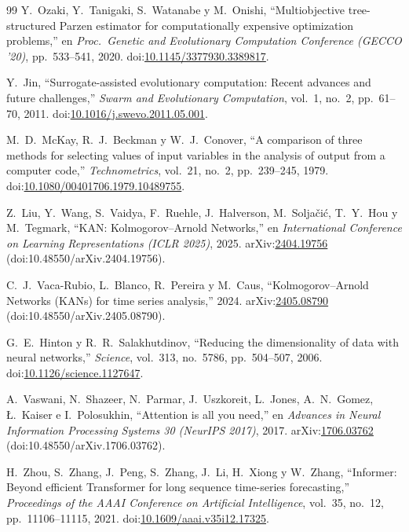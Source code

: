 \begin{thebibliography}{99}
 Y.~Ozaki, Y.~Tanigaki, S.~Watanabe y M.~Onishi, ``Multiobjective
tree-structured Parzen estimator for computationally expensive optimization
problems,'' en \emph{Proc.\ Genetic and Evolutionary Computation Conference (GECCO
'20)}, pp.~533--541, 2020.
doi:\href{https://doi.org/10.1145/3377930.3389817}{10.1145/3377930.3389817}.

 Y.~Jin, ``Surrogate-assisted evolutionary computation: Recent
advances and future challenges,'' \emph{Swarm and Evolutionary Computation}, vol.~1,
no.~2, pp.~61--70, 2011.
doi:\href{https://doi.org/10.1016/j.swevo.2011.05.001}{10.1016/j.swevo.2011.05.001}.

 M.~D.~McKay, R.~J.~Beckman y W.~J.~Conover, ``A comparison of
three methods for selecting values of input variables in the analysis of output from a
computer code,'' \emph{Technometrics}, vol.~21, no.~2, pp.~239--245, 1979.
doi:\href{https://doi.org/10.1080/00401706.1979.10489755}{10.1080/00401706.1979.10489755}.

 Z.~Liu, Y.~Wang, S.~Vaidya, F.~Ruehle, J.~Halverson,
M.~Solja\v{c}i\'c, T.~Y.~Hou y M.~Tegmark, ``KAN: Kolmogorov--Arnold Networks,'' en
\emph{International Conference on Learning Representations (ICLR 2025)}, 2025.
arXiv:\href{https://doi.org/10.48550/arXiv.2404.19756}{2404.19756}
(doi:10.48550/arXiv.2404.19756).

 C.~J.~Vaca-Rubio, L.~Blanco, R.~Pereira y M.~Caus,
``Kolmogorov--Arnold Networks (KANs) for time series analysis,'' 2024.
arXiv:\href{https://doi.org/10.48550/arXiv.2405.08790}{2405.08790}
(doi:10.48550/arXiv.2405.08790).

 G.~E.~Hinton y R.~R.~Salakhutdinov, ``Reducing the
dimensionality of data with neural networks,'' \emph{Science}, vol.~313, no.~5786,
pp.~504--507, 2006.
doi:\href{https://doi.org/10.1126/science.1127647}{10.1126/science.1127647}.

 A.~Vaswani, N.~Shazeer, N.~Parmar, J.~Uszkoreit, L.~Jones,
A.~N.~Gomez, {\L}.~Kaiser e I.~Polosukhin, ``Attention is all you need,'' en
\emph{Advances in Neural Information Processing Systems 30 (NeurIPS 2017)}, 2017.
arXiv:\href{https://doi.org/10.48550/arXiv.1706.03762}{1706.03762}
(doi:10.48550/arXiv.1706.03762).

 H.~Zhou, S.~Zhang, J.~Peng, S.~Zhang, J.~Li, H.~Xiong y
W.~Zhang, ``Informer: Beyond efficient Transformer for long sequence time-series
forecasting,'' \emph{Proceedings of the AAAI Conference on Artificial Intelligence},
vol.~35, no.~12, pp.~11106--11115, 2021.
doi:\href{https://doi.org/10.1609/aaai.v35i12.17325}{10.1609/aaai.v35i12.17325}.

\end{thebibliography}
